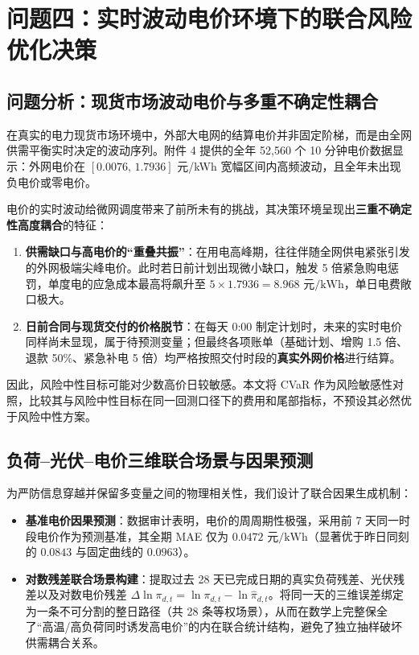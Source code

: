 \documentclass[withoutpreface]{cumcmthesis}
\begin{document}
\section{问题四：实时波动电价环境下的联合风险优化决策}

\subsection{问题分析：现货市场波动电价与多重不确定性耦合}
在真实的电力现货市场环境中，外部大电网的结算电价并非固定阶梯，而是由全网供需平衡实时决定的波动序列。附件 4 提供的全年 52,560 个 10 分钟电价数据显示：外网电价在 $[0.0076,\, 1.7936]$ 元/kWh 宽幅区间内高频波动，且全年未出现负电价或零电价。

电价的实时波动给微网调度带来了前所未有的挑战，其决策环境呈现出\textbf{三重不确定性高度耦合}的特征：
\begin{enumerate}
    \item \textbf{供需缺口与高电价的“重叠共振”}：在用电高峰期，往往伴随全网供电紧张引发的外网极端尖峰电价。此时若日前计划出现微小缺口，触发 5 倍紧急购电惩罚，单度电的应急成本最高将飙升至 $5 \times 1.7936 = 8.968\text{ 元/kWh}$，单日电费敞口极大。
    \item \textbf{日前合同与现货交付的价格脱节}：在每天 0:00 制定计划时，未来的实时电价同样尚未显现，属于待预测变量；但最终各项账单（基础计划、增购 1.5 倍、退款 50\%、紧急补电 5 倍）均严格按照交付时段的\textbf{真实外网价格}进行结算。
\end{enumerate}
因此，风险中性目标可能对少数高价日较敏感。本文将 CVaR 作为风险敏感性对照，比较其与风险中性目标在同一回测口径下的费用和尾部指标，不预设其必然优于风险中性方案。

\subsection{负荷--光伏--电价三维联合场景与因果预测}
为严防信息穿越并保留多变量之间的物理相关性，我们设计了联合因果生成机制：
\begin{itemize}
    \item \textbf{基准电价因果预测}：数据审计表明，电价的周周期性极强，采用前 7 天同一时段电价作为预测基准，其全期 MAE 仅为 $0.0472\text{ 元/kWh}$（显著优于昨日同刻的 $0.0843$ 与固定曲线的 $0.0963$）。
    \item \textbf{对数残差联合场景构建}：提取过去 28 天已完成日期的真实负荷残差、光伏残差以及对数电价残差 $\Delta \ln \pi_{d,t} = \ln \pi_{d,t} - \ln \widehat{\pi}_{d,t}$。将同一天的三维误差绑定为一条不可分割的整日路径（共 28 条等权场景），从而在数学上完整保全了“高温/高负荷同时诱发高电价”的内在联合统计结构，避免了独立抽样破坏供需耦合关系。
\end{itemize}
\end{document}
